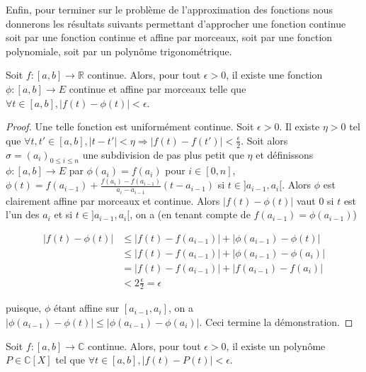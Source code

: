 Enfin, pour terminer sur le problème de l'approximation des fonctions nous donnerons les résultats suivants permettant d'approcher une fonction continue soit par une fonction continue et affine par morceaux, soit par une fonction polynomiale, soit par un polynôme trigonométrique.

\begin{thm}
Soit $f : [a,b] \to \mathbb{R}$ continue. Alors, pour tout $\epsilon > 0$, il existe une fonction $\phi : [a,b] \to E$ continue et affine par morceaux telle que $\forall t \in [a,b], |f(t) - \phi(t)| < \epsilon$.
\end{thm}

\begin{proof}
Une telle fonction est uniformément continue. Soit $\epsilon > 0$. Il existe $\eta > 0$ tel que $\forall t,t' \in [a,b], |t - t'| < \eta \Rightarrow |f(t) - f(t')| < \frac{\epsilon}{2}$. Soit alors $\sigma = (a_i)_{0 \leq i \leq n}$ une subdivision de pas plus petit que $\eta$ et définissons $\phi : [a,b] \to E$ par $\phi(a_i) = f(a_i)$ pour $i \in [0,n]$, $\phi(t) = f(a_{i-1}) + \frac{f(a_i)-f(a_{i-1})}{a_i-a_{i-1}}(t - a_{i-1})$ si $t \in ]a_{i-1},a_i[$. Alors $\phi$ est clairement affine par morceaux et continue. Alors $|f(t) - \phi(t)|$ vaut $0$ si $t$ est l'un des $a_i$ et si $t \in ]a_{i-1},a_i[$, on a (en tenant compte de $f(a_{i-1}) = \phi(a_{i-1})$)

\begin{align*}
|f(t) - \phi(t)| &\leq |f(t) - f(a_{i-1})| + |\phi(a_{i-1}) - \phi(t)| \\
&\leq |f(t) - f(a_{i-1})| + |\phi(a_{i-1}) - \phi(a_i)| \\
&= |f(t) - f(a_{i-1})| + |f(a_{i-1}) - f(a_i)| \\
&< 2\frac{\epsilon}{2} = \epsilon
\end{align*}

puisque, $\phi$ étant affine sur $[a_{i-1},a_i]$, on a $|\phi(a_{i-1}) - \phi(t)| \leq |\phi(a_{i-1}) - \phi(a_i)|$. Ceci termine la démonstration.
\end{proof}

\begin{thm}
Soit $f : [a,b] \to \mathbb{C}$ continue. Alors, pour tout $\epsilon > 0$, il existe un polynôme $P \in \mathbb{C}[X]$ tel que $\forall t \in [a,b], |f(t) - P(t)| < \epsilon$.
\end{thm}

